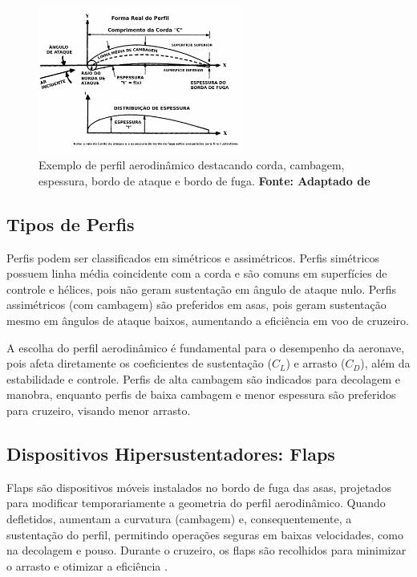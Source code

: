 \begin{figure}[H]
    \centering
    \includegraphics[width=0.6\textwidth]{figures/perfil_parametros.jpg}
    \caption{Exemplo de perfil aerodinâmico destacando corda, cambagem, espessura, bordo de ataque e bordo de fuga. \textbf{Fonte: Adaptado de \cite{raymer2018aircraft}}}
    \label{fig:perfil_parametros}
\end{figure}

\subsection{Tipos de Perfis}
Perfis podem ser classificados em simétricos e assimétricos. Perfis simétricos possuem linha média coincidente com a corda e são comuns em superfícies de controle e hélices, pois não geram sustentação em ângulo de ataque nulo. Perfis assimétricos (com cambagem) são preferidos em asas, pois geram sustentação mesmo em ângulos de ataque baixos, aumentando a eficiência em voo de cruzeiro.

A escolha do perfil aerodinâmico é fundamental para o desempenho da aeronave, pois afeta diretamente os coeficientes de sustentação (\(C_L\)) e arrasto (\(C_D\)), além da estabilidade e controle. Perfis de alta cambagem são indicados para decolagem e manobra, enquanto perfis de baixa cambagem e menor espessura são preferidos para cruzeiro, visando menor arrasto.

\subsection{Dispositivos Hipersustentadores: Flaps}
Flaps são dispositivos móveis instalados no bordo de fuga das asas, projetados para modificar temporariamente a geometria do perfil aerodinâmico. Quando defletidos, aumentam a curvatura (cambagem) e, consequentemente, a sustentação do perfil, permitindo operações seguras em baixas velocidades, como na decolagem e pouso. Durante o cruzeiro, os flaps são recolhidos para minimizar o arrasto e otimizar a eficiência \cite{raymer2018aircraft}.

